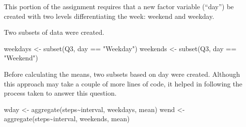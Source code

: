 \documentclass[
]{article}
\newenvironment{Shaded}{\begin{snugshade}}{\end{snugshade}}
\newcommand{\AttributeTok}[1]{\textcolor[rgb]{0.77,0.63,0.00}{#1}}
\newcommand{\ConstantTok}[1]{\textcolor[rgb]{0.00,0.00,0.00}{#1}}
\newcommand{\FunctionTok}[1]{\textcolor[rgb]{0.00,0.00,0.00}{#1}}
\newcommand{\NormalTok}[1]{#1}
\newcommand{\OtherTok}[1]{\textcolor[rgb]{0.56,0.35,0.01}{#1}}
\newcommand{\SpecialCharTok}[1]{\textcolor[rgb]{0.00,0.00,0.00}{#1}}
\newcommand{\StringTok}[1]{\textcolor[rgb]{0.31,0.60,0.02}{#1}}
\begin{document}
This portion of the assignment requires that a new factor variable
(``day'') be created with two levels differentiating the week: weekend
and weekday.

\begin{Shaded}
\end{Shaded}

Two subsets of data were created.

\begin{Shaded}
\begin{Highlighting}[]
\NormalTok{weekdays }\OtherTok{\textless{}{-}} \FunctionTok{subset}\NormalTok{(Q3, day }\SpecialCharTok{==} \StringTok{"Weekday"}\NormalTok{)}
\NormalTok{weekends }\OtherTok{\textless{}{-}} \FunctionTok{subset}\NormalTok{(Q3, day }\SpecialCharTok{==} \StringTok{"Weekend"}\NormalTok{)}
\end{Highlighting}
\end{Shaded}

Before calculating the means, two subsets based on day were created.
Although this approach may take a couple of more lines of code, it
helped in following the process taken to answer this question.

\begin{Shaded}
\begin{Highlighting}[]
\NormalTok{wday }\OtherTok{\textless{}{-}} \FunctionTok{aggregate}\NormalTok{(steps}\SpecialCharTok{\textasciitilde{}}\NormalTok{interval, weekdays, mean)}
\NormalTok{wend }\OtherTok{\textless{}{-}} \FunctionTok{aggregate}\NormalTok{(steps}\SpecialCharTok{\textasciitilde{}}\NormalTok{interval, weekends, mean)}
\end{Highlighting}
\end{Shaded}
\end{document}
